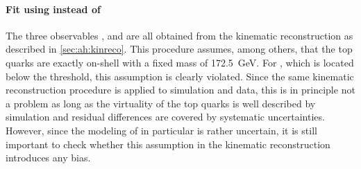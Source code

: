 \paragraph{Fit using \mbbll instead of \mtt}
The three observables \mtt, \chel and \chan are all obtained from the kinematic reconstruction as described in \cref{sec:ah:kinreco}. This procedure assumes, among others, that the top quarks are exactly on-shell with a fixed mass of \SI{172.5}{\GeV}. For \etat, which is located below the \ttbar threshold, this assumption is clearly violated. Since the same kinematic reconstruction procedure is applied to simulation and data, this is in principle not a problem as long as the virtuality of the top quarks is well described by simulation and residual differences are covered by systematic uncertainties. However, since the modeling of \etat in particular is rather uncertain, it is still important to check whether this assumption in the kinematic reconstruction introduces any bias.

